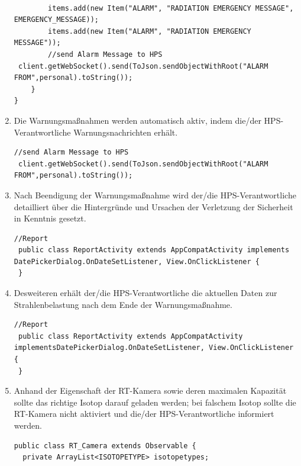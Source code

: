 \begin{enumerate}
\begin{lstlisting}[frame=single]
                
        items.add(new Item("ALARM", "RADIATION EMERGENCY MESSAGE", EMERGENCY_MESSAGE));
        items.add(new Item("ALARM", "RADIATION EMERGENCY MESSAGE"));
        //send Alarm Message to HPS 
 client.getWebSocket().send(ToJson.sendObjectWithRoot("ALARM FROM",personal).toString()); 
    }
}
\end{lstlisting}
\item Die Warnungsmaßnahmen werden automatisch aktiv, indem die/der HPS-Verantwortliche
Warnungsnachrichten erhält.\\
\begin{lstlisting}[frame=single]
    //send Alarm Message to HPS 
 client.getWebSocket().send(ToJson.sendObjectWithRoot("ALARM FROM",personal).toString());
\end{lstlisting}
\item Nach Beendigung der Warnungsmaßnahme wird der/die HPS-Verantwortliche detailliert
über die Hintergründe und Ursachen der Verletzung der Sicherheit in Kenntnis gesetzt.
\begin{lstlisting}[frame=single]
    //Report  
 public class ReportActivity extends AppCompatActivity implements DatePickerDialog.OnDateSetListener, View.OnClickListener {
 }
\end{lstlisting}
\item Desweiteren erhält der/die HPS-Verantwortliche die aktuellen Daten zur Strahlenbelastung
nach dem Ende der Warnungsmaßnahme.\\
\begin{lstlisting}[frame=single]
    //Report  
 public class ReportActivity extends AppCompatActivity implementsDatePickerDialog.OnDateSetListener, View.OnClickListener {
 }
\end{lstlisting}
\item Anhand der Eigenschaft der RT-Kamera sowie deren maximalen Kapazität sollte das richtige
Isotop darauf geladen werden; bei falschem Isotop sollte die RT-Kamera nicht aktiviert und
die/der HPS-Verantwortliche informiert werden.\\
\begin{lstlisting}[frame=single]
  public class RT_Camera extends Observable {
  private ArrayList<ISOTOPETYPE> isotopetypes;
  

\end{lstlisting}
\end{enumerate}
